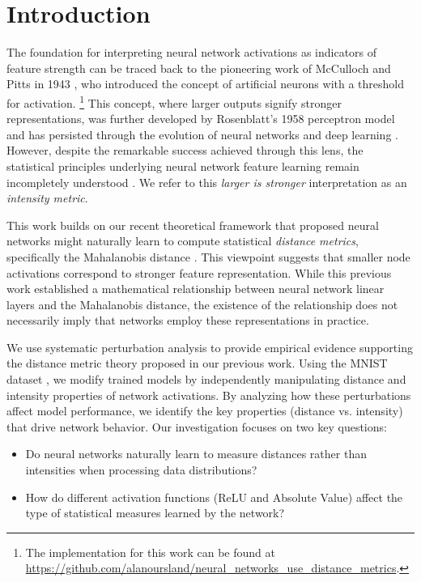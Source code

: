 \section{Introduction}

The foundation for interpreting neural network activations as indicators of feature strength can be traced back to the pioneering work of McCulloch and Pitts in 1943 \citep{mcculloch1943logical}, who introduced the concept of artificial neurons with a threshold for activation. \footnote{The implementation for this work can be found at \url{https://github.com/alanoursland/neural_networks_use_distance_metrics}.} This concept, where larger outputs signify stronger representations, was further developed by Rosenblatt's 1958 perceptron model \citep{rosenblatt1958perceptron} and has persisted through the evolution of neural networks and deep learning \citep{schmidhuber2015deep}. However, despite the remarkable success achieved through this lens, the statistical principles underlying neural network feature learning remain incompletely understood \citep{lipton2018mythos}. We refer to this \emph{larger is stronger} interpretation as an \emph{intensity metric}. \citep{simonyan2013deep}

This work builds on our recent theoretical framework \citep{oursland2024interpreting} that proposed neural networks might naturally learn to compute statistical \emph{distance metrics}, specifically the Mahalanobis distance \citep{mahalanobis1936generalized}. This viewpoint suggests that smaller node activations correspond to stronger feature representation. While this previous work established a mathematical relationship between neural network linear layers and the Mahalanobis distance, the existence of the relationship does not necessarily imply that networks employ these representations in practice. 

We use systematic perturbation analysis \citep{szegedy2013intriguing, goodfellow2014explaining} to provide empirical evidence supporting the distance metric theory proposed in our previous work. Using the MNIST dataset \citep{lecun1998gradient}, we modify trained models by independently manipulating distance and intensity properties of network activations. By analyzing how these perturbations affect model performance, we identify the key properties (distance vs. intensity) that drive network behavior. Our investigation focuses on two key questions:

\begin{itemize}
    \item Do neural networks naturally learn to measure distances rather than intensities when processing data distributions?
    \item How do different activation functions (ReLU and Absolute Value) affect the type of statistical measures learned by the network?
\end{itemize}

